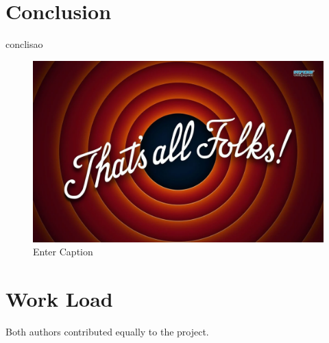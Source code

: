 \documentclass[conference]{IEEEtran}
\begin{document}
\section{Conclusion}

conclisao

\begin{figure}[H]
    \centering
    \includegraphics[width=0.5\linewidth]{image.png}
    \caption{Enter Caption}
    \label{fig:enter-label}
\end{figure}
\section*{Work Load}

Both authors contributed equally to the project.



\end{document}
